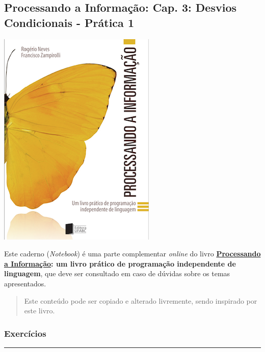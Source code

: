 \documentclass[12pt,a4paper]{article}
\renewcommand{\linethickness}{0.05em}
\begin{document}
    \hypertarget{processando-a-informauxe7uxe3o-cap.-3-desvios-condicionais---pruxe1tica-1}{%
\subsection{Processando a Informação: Cap. 3: Desvios Condicionais -
Prática
1}\label{processando-a-informauxe7uxe3o-cap.-3-desvios-condicionais---pruxe1tica-1}}

    \includegraphics{"figs/Capa_Processando_Informacao.jpg"}

Este caderno (\emph{Notebook}) é uma parte complementar \emph{online} do
livro
\textbf{\href{https://editora.ufabc.edu.br/matematica-e-ciencias-da-computacao/58-processando-a-informacao}{Processando
a Informação}: um livro prático de programação independente de
linguagem}, que deve ser consultado em caso de dúvidas sobre os temas
apresentados.

\begin{quote}
Este conteúdo pode ser copiado e alterado livremente, sendo inspirado
por este livro.
\end{quote}

    \hypertarget{exercuxedcios}{%
\subsubsection{Exercícios}\label{exercuxedcios}}

    \begin{center}\rule{0.5\linewidth}{\linethickness}\end{center}
\end{document}
